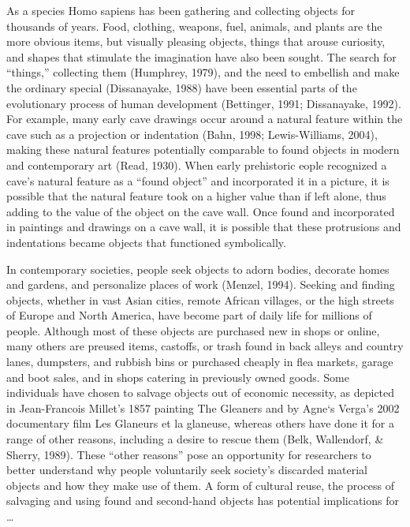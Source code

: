 As a species Homo sapiens has been gathering and collecting objects for thousands of years. Food, clothing, weapons, fuel, animals, and plants are the more obvious items, but visually pleasing objects, things that arouse curiosity, and shapes that stimulate the imagination have also been sought. The search for “things,” collecting them (Humphrey, 1979), and the need to embellish and make the ordinary special (Dissanayake, 1988) have been essential parts of the evolutionary process of human development (Bettinger, 1991; Dissanayake, 1992). For example, many early cave drawings occur around a natural feature within the cave such as a projection or indentation (Bahn, 1998; Lewis-Williams, 2004), making these natural features potentially comparable to found objects in modern and contemporary art (Read, 1930). When early prehistoric eople recognized a cave’s natural feature as a “found object” and incorporated it in a picture, it is possible that the natural feature took on a higher value than if left alone, thus adding to the value of the object on the cave wall. Once found and incorporated in paintings and drawings on a cave wall, it is possible that these protrusions and indentations became objects that functioned symbolically.

In contemporary societies, people seek objects to adorn bodies, decorate homes and gardens, and personalize places of work (Menzel, 1994). Seeking and finding objects, whether in vast Asian cities, remote African villages, or the high streets of Europe and North America, have become part of daily life for millions of people. Although most of these objects are purchased new in shops or online, many others are preused items, castoffs, or trash found in back alleys and country lanes, dumpsters, and rubbish bins or purchased cheaply in flea markets, garage and boot sales, and in shops catering in previously owned goods. Some individuals have chosen to salvage objects out of economic necessity, as depicted in Jean-Francois Millet’s 1857 painting The Gleaners and by Agne`s Verga’s 2002 documentary film Les Glaneurs et la glaneuse, whereas others have done it for a range of other reasons, including a desire to rescue them (Belk, Wallendorf, \& Sherry, 1989). These “other reasons” pose an opportunity for researchers to better understand why people voluntarily seek society’s discarded material objects and how they make use of them. A form of cultural reuse, the process
of salvaging and using found and second-hand objects has potential implications for \ldots 


